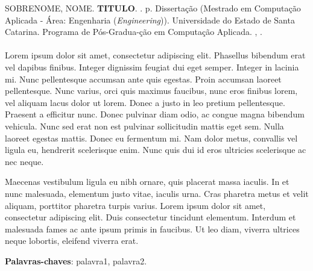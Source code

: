 \setlength{\absparsep}{18pt} %

\begin{resumo}
SOBRENOME, NOME. \textbf{TITULO}. \imprimirdata. \pageref{LastPage} p. Dissertação (Mestrado em Computação Aplicada - Área: Engenharia (\textit{Engineering})). Universidade do Estado de Santa Catarina. Programa de Pós-Gradua-ção em Computação Aplicada. \imprimirlocal, \imprimirdata.\\
\\
Lorem ipsum dolor sit amet, consectetur adipiscing elit. Phasellus bibendum erat vel dapibus finibus. Integer dignissim feugiat dui eget semper. Integer in lacinia mi. Nunc pellentesque accumsan ante quis egestas. Proin accumsan laoreet pellentesque. Nunc varius, orci quis maximus faucibus, nunc eros finibus lorem, vel aliquam lacus dolor ut lorem. Donec a justo in leo pretium pellentesque. Praesent a efficitur nunc. Donec pulvinar diam odio, ac congue magna bibendum vehicula. Nunc sed erat non est pulvinar sollicitudin mattis eget sem. Nulla laoreet egestas mattis. Donec eu fermentum mi. Nam dolor metus, convallis vel ligula eu, hendrerit scelerisque enim. Nunc quis dui id eros ultricies scelerisque ac nec neque.

Maecenas vestibulum ligula eu nibh ornare, quis placerat massa iaculis. In et nunc malesuada, elementum justo vitae, iaculis urna. Cras pharetra metus et velit aliquam, porttitor pharetra turpis varius. Lorem ipsum dolor sit amet, consectetur adipiscing elit. Duis consectetur tincidunt elementum. Interdum et malesuada fames ac ante ipsum primis in faucibus. Ut leo diam, viverra ultrices neque lobortis, eleifend viverra erat. 
\vspace{\onelineskip}
 
\noindent 
   
\textbf{Palavras-chaves}: palavra1, palavra2.
\end{resumo}
